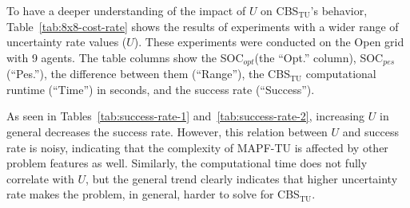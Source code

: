 \documentclass[jair,twoside,11pt,theapa]{article}
\newcommand{\cbstu}{CBS$\mathrm{_{TU}}$\xspace}
\newcommand{\mapftu}{MAPF-TU\xspace}
\newcommand{\socopt}{SOC$_{opt}$\xspace}
\newcommand{\socpes}{SOC$_{pes}$\xspace}
\begin{document}
To have a deeper understanding of the impact of $U$ on \cbstu's behavior, Table~\ref{tab:8x8-cost-rate} shows the results of experiments with a wider range of uncertainty rate values ($U$). 
These experiments were conducted on the Open grid with 9 agents. 
The table columns show 
the \socopt (the ``Opt.'' column), 
\socpes (``Pes.''), 
the difference between them (``Range''), 
the \cbstu computational runtime (``Time'') in seconds, 
and the success rate (``Success''). 


As seen in Tables~\ref{tab:success-rate-1} and~\ref{tab:success-rate-2}, increasing $U$ in general decreases the success rate. 
However, this relation between $U$ and success rate is noisy, indicating that the complexity of \mapftu is affected by other problem features as well. Similarly, the computational time does not fully correlate with $U$, but the general trend 
clearly indicates that higher uncertainty rate makes the problem, in general, harder to solve for \cbstu.  
\end{document}
